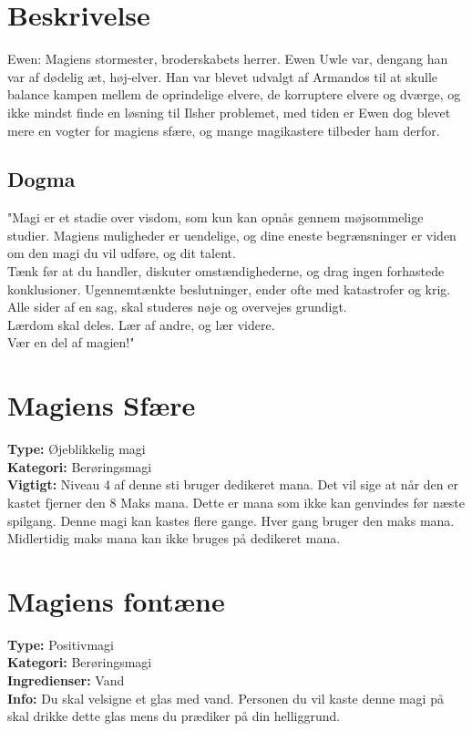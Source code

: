 \section{Beskrivelse}
Ewen: Magiens stormester, broderskabets herrer. Ewen Uwle var, dengang han var af dødelig æt, høj-elver. Han var blevet udvalgt af Armandos til at skulle balance kampen mellem de oprindelige elvere, de korruptere elvere og dværge, og ikke mindst finde en løsning til Ilsher problemet, med tiden er Ewen dog blevet mere en vogter for magiens sfære, og mange magikastere tilbeder ham derfor.
\subsection{Dogma}
"Magi er et stadie over visdom, som kun kan opnås gennem møjsommelige studier. Magiens muligheder er uendelige, og dine eneste begrænsninger er viden om den magi du vil udføre, og dit talent.\\
Tænk før at du handler, diskuter omstændighederne, og drag ingen forhastede konklusioner. Ugennemtænkte beslutninger, ender ofte med katastrofer og krig. Alle sider af en sag, skal studeres nøje og overvejes grundigt.\\
Lærdom skal deles. Lær af andre, og lær videre.\\
Vær en del af magien!"


\section{Magiens Sfære}
\textbf{Type:} Øjeblikkelig magi \\
\textbf{Kategori:} Berøringsmagi\\
\textbf{Vigtigt:} Niveau 4 af denne sti bruger dedikeret mana. Det vil sige at når den er kastet fjerner den 8 Maks mana. Dette er mana som ikke kan genvindes før næste spilgang. Denne magi kan kastes flere gange. Hver gang bruger den maks mana. Midlertidig maks mana kan ikke bruges på dedikeret mana.

\section{Magiens fontæne}
\textbf{Type:} Positivmagi\\
\textbf{Kategori:} Berøringsmagi\\
\textbf{Ingredienser:} Vand\\
\textbf{Info:} Du skal velsigne et glas med vand. Personen du vil kaste denne magi på skal drikke dette glas mens du prædiker på din helliggrund.

